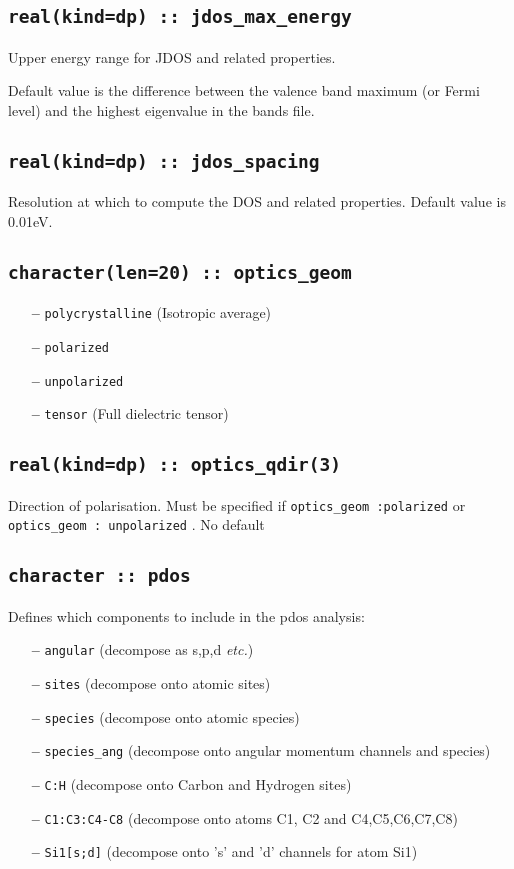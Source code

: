 \documentclass[a4paper,11pt,twoside]{book}
\begin{document}
\subsection[jdos\_max\_energy]{\tt real(kind=dp) :: jdos\_max\_energy}
Upper energy range for JDOS and related properties.

Default value is the difference between the valence band maximum (or
Fermi level) and the highest eigenvalue in the bands file.

\subsection[jdos\_spacing]{\tt real(kind=dp) :: jdos\_spacing} 
Resolution at which to compute the DOS and related properties.
Default value is 0.01eV. 

\subsection[optics\_geom]{\tt character(len=20) :: optics\_geom}

\begin{itemize}
\item[{\bf --}]  \verb#polycrystalline# (Isotropic average)
\item[{\bf --}]  \verb#polarized#  
\item[{\bf --}]  \verb#unpolarized# 
\item[{\bf --}]  \verb#tensor# (Full dielectric tensor)
\end{itemize}


\subsection[optics\_qdir]{\tt real(kind=dp) :: optics\_qdir(3)}
Direction of polarisation. Must be specified if \verb#optics_geom :polarized#  
or \verb#optics_geom : unpolarized# .
No default


\subsection[pdos]{\tt character :: pdos}
Defines which components to include in the pdos analysis:

\begin{itemize}
\item[{\bf --}]  \verb#angular# (decompose as s,p,d \emph{etc.})
\item[{\bf --}]  \verb#sites#    (decompose onto atomic sites)
\item[{\bf --}]  \verb#species#    (decompose onto atomic species)
\item[{\bf --}]  \verb#species_ang#    (decompose onto angular momentum channels and species)
\item[{\bf --}]  \verb#C:H#     (decompose onto Carbon and Hydrogen sites)
\item[{\bf --}]  \verb#C1:C3:C4-C8#  (decompose onto atoms C1, C2 and C4,C5,C6,C7,C8)
\item[{\bf --}]  \verb#Si1[s;d]#     (decompose onto 's' and 'd' channels for
  atom Si1)

\end{itemize}
\end{document}
